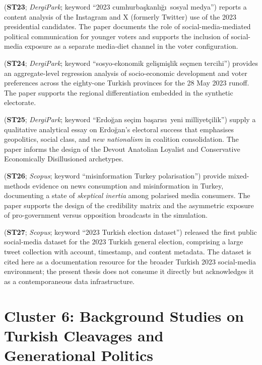 \documentclass[12pt,a4paper]{report}
\begin{document}
\citet{karaca2024socialmedia} (\textbf{ST23}; \emph{DergiPark}; keyword \enquote{2023 cumhurba\c{s}kanl\i\u{g}\i\ sosyal medya}) reports a content analysis of the Instagram and X (formerly Twitter) use of the 2023 presidential candidates. The paper documents the role of social-media-mediated political communication for younger voters and supports the inclusion of social-media exposure as a separate media-diet channel in the voter configuration.

\citet{yildirim2025sege} (\textbf{ST24}; \emph{DergiPark}; keyword \enquote{sosyo-ekonomik geli\c{s}mi\c{s}lik se\c{c}men tercihi}) provides an aggregate-level regression analysis of socio-economic development and voter preferences across the eighty-one Turkish provinces for the 28 May 2023 runoff. The paper supports the regional differentiation embedded in the synthetic electorate.

\citet{cinkara2025erdogan} (\textbf{ST25}; \emph{DergiPark}; keyword \enquote{Erdo\u{g}an se\c{c}im ba\c{s}ar\i s\i\ yeni milliyet\c{c}ilik}) supply a qualitative analytical essay on Erdo\u{g}an's electoral success that emphasises geopolitics, social class, and \emph{new nationalism} in coalition consolidation. The paper informs the design of the Devout Anatolian Loyalist and Conservative Economically Disillusioned archetypes.

\citet{bozdag2022skeptical} (\textbf{ST26}; \emph{Scopus}; keyword \enquote{misinformation Turkey polarisation}) provide mixed-methods evidence on news consumption and misinformation in Turkey, documenting a state of \emph{skeptical inertia} among polarised media consumers. The paper supports the design of the credibility matrix and the asymmetric exposure of pro-government versus opposition broadcasts in the simulation.

\citet{najafi2024dataset} (\textbf{ST27}; \emph{Scopus}; keyword \enquote{2023 Turkish election dataset}) released the first public social-media dataset for the 2023 Turkish general election, comprising a large tweet collection with account, timestamp, and content metadata. The dataset is cited here as a documentation resource for the broader Turkish 2023 social-media environment; the present thesis does not consume it directly but acknowledges it as a contemporaneous data infrastructure.

\section{Cluster 6: Background Studies on Turkish Cleavages and Generational Politics}
\label{sec:litcluster6}
\end{document}
